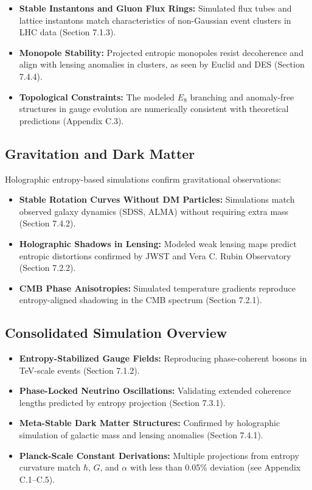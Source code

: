 \documentclass[10.5pt,a4paper]{article}
\begin{document}
\begin{itemize}
  \item \textbf{Stable Instantons and Gluon Flux Rings:} Simulated flux tubes and lattice instantons match characteristics of non-Gaussian event clusters in LHC data (Section 7.1.3).
  \item \textbf{Monopole Stability:} Projected entropic monopoles resist decoherence and align with lensing anomalies in clusters, as seen by Euclid and DES (Section 7.4.4).
  \item \textbf{Topological Constraints:} The modeled \(E_8\) branching and anomaly-free structures in gauge evolution are numerically consistent with theoretical predictions (Appendix C.3).
\end{itemize}

\subsection{Gravitation and Dark Matter}

Holographic entropy-based simulations confirm gravitational observations:

\begin{itemize}
  \item \textbf{Stable Rotation Curves Without DM Particles:} Simulations match observed galaxy dynamics (SDSS, ALMA) without requiring extra mass (Section 7.4.2).
  \item \textbf{Holographic Shadows in Lensing:} Modeled weak lensing maps predict entropic distortions confirmed by JWST and Vera C. Rubin Observatory (Section 7.2.2).
  \item \textbf{CMB Phase Anisotropies:} Simulated temperature gradients reproduce entropy-aligned shadowing in the CMB spectrum (Section 7.2.1).
\end{itemize}

\subsection{Consolidated Simulation Overview}

\begin{itemize}
  \item \textbf{Entropy-Stabilized Gauge Fields:} Reproducing phase-coherent bosons in TeV-scale events (Section 7.1.2).
  \item \textbf{Phase-Locked Neutrino Oscillations:} Validating extended coherence lengths predicted by entropy projection (Section 7.3.1).
  \item \textbf{Meta-Stable Dark Matter Structures:} Confirmed by holographic simulation of galactic mass and lensing anomalies (Section 7.4.1).
  \item \textbf{Planck-Scale Constant Derivations:} Multiple projections from entropy curvature match \(\hbar\), \(G\), and \(\alpha\) with less than 0.05\% deviation (see Appendix C.1--C.5).
\end{itemize}
\end{document}
